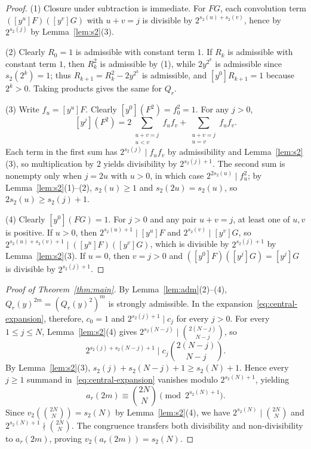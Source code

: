 \documentclass[11pt]{article}
\theoremstyle{remark}
\begin{document}
\begin{proof}
(1) Closure under subtraction is immediate. For $FG$, each convolution term $([y^u]F)([y^v]G)$ with $u + v = j$ is divisible by $2^{s_2(u) + s_2(v)}$, hence by $2^{s_2(j)}$ by Lemma~\ref{lem:s2}(3).

(2) Clearly $R_0 = 1$ is admissible with constant term $1$. If $R_k$ is admissible with constant term $1$, then $R_k^2$ is admissible by (1), while $2y^{2^k}$ is admissible since $s_2(2^k) = 1$; thus $R_{k+1} = R_k^2 - 2y^{2^k}$ is admissible, and $[y^0]R_{k+1} = 1$ because $2^k > 0$. Taking products gives the same for $Q_r$.

(3) Write $f_u = [y^u]F$. Clearly $[y^0](F^2) = f_0^2 = 1$. For any $j > 0$,
\[
  [y^j](F^2) = 2 \sum_{\substack{u+v=j \\ u < v}} f_u f_v + \sum_{\substack{u+v=j \\ u = v}} f_u f_v.
\]
Each term in the first sum has $2^{s_2(j)} \mid f_u f_v$ by admissibility and Lemma~\ref{lem:s2}(3), so multiplication by $2$ yields divisibility by $2^{s_2(j)+1}$. The second sum is nonempty only when $j = 2u$ with $u > 0$, in which case $2^{2 s_2(u)} \mid f_u^2$; by Lemma~\ref{lem:s2}(1)--(2), $s_2(u) \ge 1$ and $s_2(2u) = s_2(u)$, so $2 s_2(u) \ge s_2(j) + 1$.

(4) Clearly $[y^0](FG) = 1$. For $j > 0$ and any pair $u + v = j$, at least one of $u, v$ is positive. If $u > 0$, then $2^{s_2(u)+1} \mid [y^u]F$ and $2^{s_2(v)} \mid [y^v]G$, so $2^{s_2(u) + s_2(v) + 1} \mid ([y^u]F)([y^v]G)$, which is divisible by $2^{s_2(j)+1}$ by Lemma~\ref{lem:s2}(3). If $u = 0$, then $v = j > 0$ and $([y^0]F)([y^j]G) = [y^j]G$ is divisible by $2^{s_2(j)+1}$.
\end{proof}

\begin{proof}[Proof of Theorem~\ref{thm:main}]
By Lemma~\ref{lem:adm}(2)--(4), $Q_r(y)^{2m} = (Q_r(y)^2)^m$ is strongly admissible. In the expansion~\eqref{eq:central-expansion}, therefore, $c_0 = 1$ and $2^{s_2(j)+1} \mid c_j$ for every $j > 0$. For every $1 \le j \le N$, Lemma~\ref{lem:s2}(4) gives $2^{s_2(N-j)} \mid \binom{2(N-j)}{N-j}$, so
\[
  2^{s_2(j) + s_2(N-j) + 1} \;\Big|\; c_j \binom{2(N-j)}{N-j}.
\]
By Lemma~\ref{lem:s2}(3), $s_2(j) + s_2(N-j) + 1 \ge s_2(N) + 1$. Hence every $j \ge 1$ summand in~\eqref{eq:central-expansion} vanishes modulo $2^{s_2(N)+1}$, yielding
\[
  a_r(2m) \equiv \binom{2N}{N} \pmod{2^{s_2(N)+1}}.
\]
Since $v_2\!\left(\binom{2N}{N}\right) = s_2(N)$ by Lemma~\ref{lem:s2}(4), we have $2^{s_2(N)} \mid \binom{2N}{N}$ and $2^{s_2(N)+1} \nmid \binom{2N}{N}$. The congruence transfers both divisibility and non-divisibility to $a_r(2m)$, proving $v_2(a_r(2m)) = s_2(N)$.
\end{proof}
\end{document}

